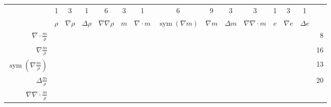 \documentclass[letterpaper,11pt,nointlimits,reqno,draft]{amsart}
\newcommand{\symmetricpart}[1]
  {\ensuremath{\operatorname{sym}\left(#1\right)}}
\begin{document}
\begin{table}[p]
\centering
\vspace{1em}
\renewcommand{\arraystretch}{1.40}   %
\newcommand{\cm}{\checkmark}         %
\newcommand{\cd}{\ensuremath{\cdot}} %
\begin{tabular}{r|cccc|cccccc|ccc|r}
&   1 &   3 &   1 &   6 &   3 &   1 &   6 &   9 &   3 &   3 &   1 &   3 &   1
\\
& $\rho$                                              %
& $\nabla\rho$                                        %
& $\Delta\rho$                                        %
& $\nabla\nabla\rho$                                  %
& $m$                                                 %
& $\nabla\cdot{}m$                                    %
& $\symmetricpart{\nabla{}m}$                         %
& $\nabla{}m$                                         %
& $\Delta{}m$                                         %
& $\nabla\nabla\cdot{}m$                              %
& $e$                                                 %
& $\nabla{}e$                                         %
& $\Delta{}e$                                         %
\\ \hline
$\nabla\cdot\frac{m}{\rho}$
& \cm & \cm &     &     & \cm & \cm &     &     &     &     &     &     &
& 8 \\
$\nabla\frac{m}{\rho}$
& \cm & \cm &     &     & \cm &     &     & \cm &     &     &     &     &
& 16 \\
$\symmetricpart{\nabla\frac{m}{\rho}}$
& \cm & \cm &     &     & \cm &     & \cm &     &     &     &     &     &
& 13 \\
$\Delta\frac{m}{\rho}$
& \cm & \cm & \cm &     & \cm &     &     & \cm & \cm &     &     &     &
& 20 \\
$\nabla\nabla\cdot\frac{m}{\rho}$

\end{tabular}
\end{table}
\end{document}

